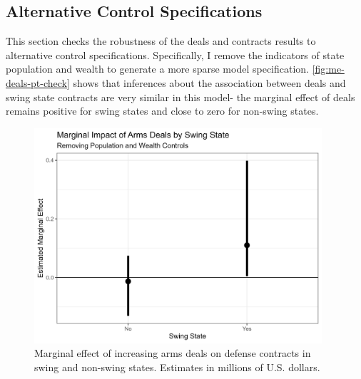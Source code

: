 \documentclass[12pt]{article}
\begin{document}
\subsection{Alternative Control Specifications}

This section checks the robustness of the deals and contracts results to alternative control specifications.
Specifically, I remove the indicators of state population and wealth to generate a more sparse model specification.
\autoref{fig:me-deals-pt-check} shows that inferences about the association between deals and swing state contracts are very similar in this model- the marginal effect of deals remains positive for swing states and close to zero for non-swing states.


\begin{figure}[htpb]
	\centering
		\includegraphics[width=0.95\textwidth]{me-deals-pt-check.png}
	\caption{Marginal effect of increasing arms deals on defense contracts in swing and non-swing states. Estimates in millions of U.S. dollars.}
	\label{fig:me-deals-pt-check}
\end{figure}


\end{document}
